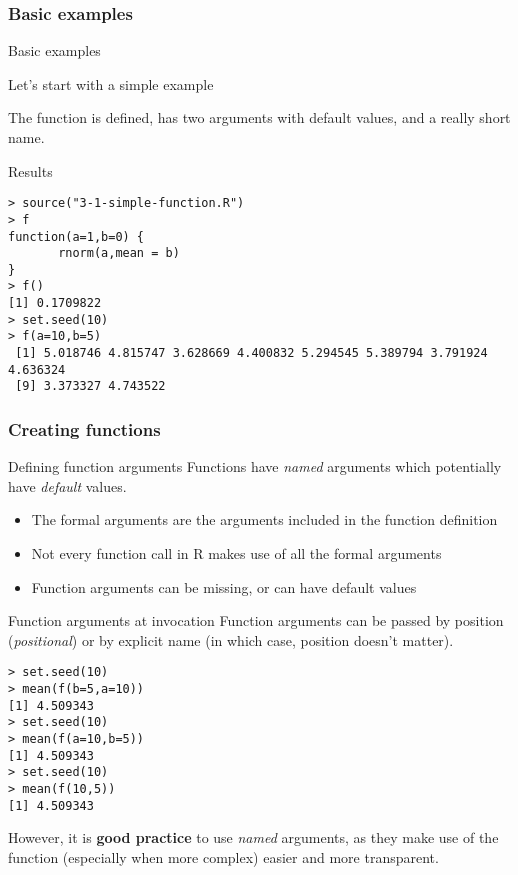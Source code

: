 \documentclass[xcolor=table,compress]{beamer}
\begin{document}
\subsubsection[Examples]{Basic examples}
\begin{frame}[fragile]{Basic examples}
\begin{block}{Let's start with a simple example}

\end{block}
\pause
The function is defined, has two arguments with default values, and a really short name.
\pause
\begin{block}{Results}
\begin{lstlisting}
> source("3-1-simple-function.R")
> f
function(a=1,b=0) {
       rnorm(a,mean = b)
}
> f()
[1] 0.1709822
> set.seed(10)
> f(a=10,b=5)
 [1] 5.018746 4.815747 3.628669 4.400832 5.294545 5.389794 3.791924 4.636324
 [9] 3.373327 4.743522
\end{lstlisting}
\end{block}
\end{frame}


\subsubsection[Creatin]{Creating functions}
\begin{frame}{Defining function arguments}
Functions have \textit{named} arguments which potentially have \textit{default} values.
\begin{itemize}
\item The formal arguments are the arguments included in the function definition
\item Not every function call in R makes use of all the formal arguments
\item Function arguments can be missing, or can have default values
\end{itemize}
\end{frame}


\begin{frame}[fragile]{Function arguments at invocation}
Function arguments can be passed by position (\textit{positional}) or by explicit name (in which case, position doesn't matter).
\begin{lstlisting}[caption=Equivalent calls,basestyle=\normalsize]
> set.seed(10)
> mean(f(b=5,a=10))
[1] 4.509343
> set.seed(10)
> mean(f(a=10,b=5))
[1] 4.509343
> set.seed(10)
> mean(f(10,5))
[1] 4.509343
\end{lstlisting}
However, it is \textbf{good practice} to use \textit{named} arguments, as they make use of the function (especially when more complex) easier and more transparent.
\end{frame}
\end{document}
